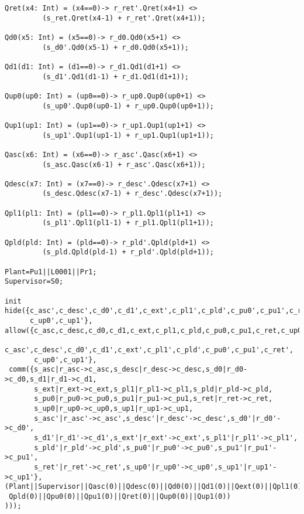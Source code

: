 \documentclass[a4paper,english,final]{article}
\theoremstyle{plain}
\theoremstyle{definition}
\begin{document}
\begin{verbatim}
Qret(x4: Int) = (x4==0)-> r_ret'.Qret(x4+1) <>
		 (s_ret.Qret(x4-1) + r_ret'.Qret(x4+1));

Qd0(x5: Int) = (x5==0)-> r_d0.Qd0(x5+1) <>
		 (s_d0'.Qd0(x5-1) + r_d0.Qd0(x5+1));

Qd1(d1: Int) = (d1==0)-> r_d1.Qd1(d1+1) <>
		 (s_d1'.Qd1(d1-1) + r_d1.Qd1(d1+1));

Qup0(up0: Int) = (up0==0)-> r_up0.Qup0(up0+1) <>
		 (s_up0'.Qup0(up0-1) + r_up0.Qup0(up0+1));

Qup1(up1: Int) = (up1==0)-> r_up1.Qup1(up1+1) <>
		 (s_up1'.Qup1(up1-1) + r_up1.Qup1(up1+1));

Qasc(x6: Int) = (x6==0)-> r_asc'.Qasc(x6+1) <>
		 (s_asc.Qasc(x6-1) + r_asc'.Qasc(x6+1));

Qdesc(x7: Int) = (x7==0)-> r_desc'.Qdesc(x7+1) <>
		 (s_desc.Qdesc(x7-1) + r_desc'.Qdesc(x7+1));

Qpl1(pl1: Int) = (pl1==0)-> r_pl1.Qpl1(pl1+1) <>
		 (s_pl1'.Qpl1(pl1-1) + r_pl1.Qpl1(pl1+1));

Qpld(pld: Int) = (pld==0)-> r_pld'.Qpld(pld+1) <>
		 (s_pld.Qpld(pld-1) + r_pld'.Qpld(pld+1));

Plant=Pu1||L0001||Pr1;
Supervisor=S0;

init
hide({c_asc',c_desc',c_d0',c_d1',c_ext',c_pl1',c_pld',c_pu0',c_pu1',c_ret',
      c_up0',c_up1'},
allow({c_asc,c_desc,c_d0,c_d1,c_ext,c_pl1,c_pld,c_pu0,c_pu1,c_ret,c_up0,c_up1,
       c_asc',c_desc',c_d0',c_d1',c_ext',c_pl1',c_pld',c_pu0',c_pu1',c_ret',
       c_up0',c_up1'},
 comm({s_asc|r_asc->c_asc,s_desc|r_desc->c_desc,s_d0|r_d0->c_d0,s_d1|r_d1->c_d1,
       s_ext|r_ext->c_ext,s_pl1|r_pl1->c_pl1,s_pld|r_pld->c_pld,
       s_pu0|r_pu0->c_pu0,s_pu1|r_pu1->c_pu1,s_ret|r_ret->c_ret,
       s_up0|r_up0->c_up0,s_up1|r_up1->c_up1,
       s_asc'|r_asc'->c_asc',s_desc'|r_desc'->c_desc',s_d0'|r_d0'->c_d0',
       s_d1'|r_d1'->c_d1',s_ext'|r_ext'->c_ext',s_pl1'|r_pl1'->c_pl1',
       s_pld'|r_pld'->c_pld',s_pu0'|r_pu0'->c_pu0',s_pu1'|r_pu1'->c_pu1',
       s_ret'|r_ret'->c_ret',s_up0'|r_up0'->c_up0',s_up1'|r_up1'->c_up1'},
(Plant||Supervisor||Qasc(0)||Qdesc(0)||Qd0(0)||Qd1(0)||Qext(0)||Qpl1(0)||
 Qpld(0)||Qpu0(0)||Qpu1(0)||Qret(0)||Qup0(0)||Qup1(0))
)));

\end{verbatim}
\end{document}
